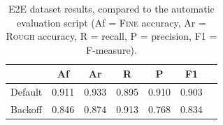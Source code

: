 \begin{table}[t]
    \centering \small
    \begin{tabular}{l cccccc} \toprule
                & \textbf{Af} & \textbf{Ar} & \textbf{R} & \textbf{P} & \textbf{F1} \\\midrule
        Default & 0.911       & 0.933       & 0.895      & 0.910      & 0.903       \\
        Backoff & 0.846       & 0.874       & 0.913      & 0.768      & 0.834       \\
        \bottomrule
    \end{tabular}
    \caption{E2E dataset results, compared to the automatic evaluation script %
        (Af = \textsc{Fine} accuracy, Ar = \textsc{Rough} accuracy, R = recall, P = precision, F1 = F-measure).}
    \label{tab:e2e}
\end{table}


